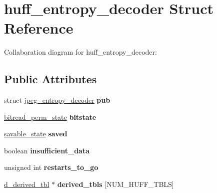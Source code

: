 \hypertarget{structhuff__entropy__decoder}{\section{huff\+\_\+entropy\+\_\+decoder Struct Reference}
\label{structhuff__entropy__decoder}
}


Collaboration diagram for huff\+\_\+entropy\+\_\+decoder\+:
\subsection*{Public Attributes}
\begin{DoxyCompactItemize}
\item 
\hypertarget{structhuff__entropy__decoder_a85f304c89441e96be66e49685cf24c3d}{struct \hyperlink{structjpeg__entropy__decoder}{jpeg\+\_\+entropy\+\_\+decoder} {\bfseries pub}}\label{structhuff__entropy__decoder_a85f304c89441e96be66e49685cf24c3d}

\item 
\hypertarget{structhuff__entropy__decoder_a06e5f8944ccb6057c6f72b3df2441223}{\hyperlink{structbitread__perm__state}{bitread\+\_\+perm\+\_\+state} {\bfseries bitstate}}\label{structhuff__entropy__decoder_a06e5f8944ccb6057c6f72b3df2441223}

\item 
\hypertarget{structhuff__entropy__decoder_a0e0efb55a8a5b01e1e49aa9c3fb8dfe6}{\hyperlink{structsavable__state}{savable\+\_\+state} {\bfseries saved}}\label{structhuff__entropy__decoder_a0e0efb55a8a5b01e1e49aa9c3fb8dfe6}

\item 
\hypertarget{structhuff__entropy__decoder_a412a9c88d74ed51774d25757b602b7ae}{boolean {\bfseries insufficient\+\_\+data}}\label{structhuff__entropy__decoder_a412a9c88d74ed51774d25757b602b7ae}

\item 
\hypertarget{structhuff__entropy__decoder_af6005b639dada949c62767bed24daa1a}{unsigned int {\bfseries restarts\+\_\+to\+\_\+go}}\label{structhuff__entropy__decoder_af6005b639dada949c62767bed24daa1a}

\item 
\hypertarget{structhuff__entropy__decoder_a615d2735aebeee55b9820f09700677be}{\hyperlink{structd__derived__tbl}{d\+\_\+derived\+\_\+tbl} $\ast$ {\bfseries derived\+\_\+tbls} \mbox{[}N\+U\+M\+\_\+\+H\+U\+F\+F\+\_\+\+T\+B\+L\+S\mbox{]}}\label{structhuff__entropy__decoder_a615d2735aebeee55b9820f09700677be}


\end{DoxyCompactItemize}
